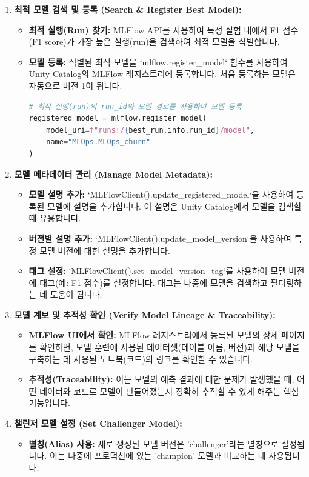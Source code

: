 \documentclass[11pt,a4paper]{article}
\begin{document}
\begin{enumerate}
    \item \textbf{최적 모델 검색 및 등록 (Search & Register Best Model):}
    \begin{itemize}
        \item \textbf{최적 실행(Run) 찾기:} MLFlow API를 사용하여 특정 실험 내에서 F1 점수(F1 score)가 가장 높은 실행(run)을 검색하여 최적 모델을 식별합니다.
        \item \textbf{모델 등록:} 식별된 최적 모델을 `mlflow.register_model` 함수를 사용하여 Unity Catalog의 MLFlow 레지스트리에 등록합니다. 처음 등록하는 모델은 자동으로 버전 1이 됩니다.
        \begin{lstlisting}[language=Python, caption={MLFlow 모델 등록 예시}, label={lst:mlflow_register_model}]
# 최적 실행(run)의 run_id와 모델 경로를 사용하여 모델 등록
registered_model = mlflow.register_model(
    model_uri=f"runs:/{best_run.info.run_id}/model",
    name="MLOps.MLOps_churn"
)
\end{lstlisting}
    \end{itemize}

    \item \textbf{모델 메타데이터 관리 (Manage Model Metadata):}
    \begin{itemize}
        \item \textbf{모델 설명 추가:} `MLFlowClient().update_registered_model`을 사용하여 등록된 모델에 설명을 추가합니다. 이 설명은 Unity Catalog에서 모델을 검색할 때 유용합니다.
        \item \textbf{버전별 설명 추가:} `MLFlowClient().update_model_version`을 사용하여 특정 모델 버전에 대한 설명을 추가합니다.
        \item \textbf{태그 설정:} `MLFlowClient().set_model_version_tag`를 사용하여 모델 버전에 태그(예: F1 점수)를 설정합니다. 태그는 나중에 모델을 검색하고 필터링하는 데 도움이 됩니다.
    \end{itemize}

    \item \textbf{모델 계보 및 추적성 확인 (Verify Model Lineage & Traceability):}
    \begin{itemize}
        \item \textbf{MLFlow UI에서 확인:} MLFlow 레지스트리에서 등록된 모델의 상세 페이지를 확인하면, 모델 훈련에 사용된 데이터셋(테이블 이름, 버전)과 해당 모델을 구축하는 데 사용된 노트북(코드)의 링크를 확인할 수 있습니다.
        \item \textbf{추적성(Traceability):} 이는 모델의 예측 결과에 대한 문제가 발생했을 때, 어떤 데이터와 코드로 모델이 만들어졌는지 정확히 추적할 수 있게 해주는 핵심 기능입니다.
    \end{itemize}

    \item \textbf{챌린저 모델 설정 (Set Challenger Model):}
    \begin{itemize}
        \item \textbf{별칭(Alias) 사용:} 새로 생성된 모델 버전은 'challenger'라는 별칭으로 설정됩니다. 이는 나중에 프로덕션에 있는 'champion' 모델과 비교하는 데 사용됩니다.
    \end{itemize}
\end{enumerate}
\end{document}
